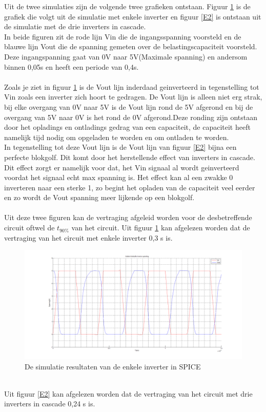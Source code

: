 
Uit de twee simulaties zijn de volgende twee grafieken ontstaan. Figuur \ref{E1} is de grafiek die volgt uit de simulatie met enkele inverter en figuur \ref{E2} is ontstaan uit de simulatie met de drie inverters in cascade.
\\
In beide figuren zit de rode lijn Vin die de ingangsspanning voorsteld en de blauwe lijn Vout die de spanning gemeten over de belastingscapaciteit voorsteld. Deze ingangspanning gaat van 0V naar 5V(Maximale spanning) en andersom binnen 0,05s en heeft een periode van 0,4s.
\\
\\
Zoals je ziet in figuur \ref{E1} is de Vout lijn inderdaad geinverteerd in tegenstelling tot Vin zoals een inverter zich hoort te gedragen. De Vout lijn is alleen niet erg strak, bij elke overgang van 0V naar 5V is de Vout lijn rond de 5V afgerond en bij de overgang van 5V naar 0V is het rond de 0V afgerond.Deze ronding zijn ontstaan door het opladings en ontladings gedrag van een capaciteit, de capaciteit heeft namelijk tijd nodig om opgeladen te worden en om ontladen te worden.  
\\
In tegenstelling tot deze Vout lijn is de Vout lijn van figuur \ref{E2} bijna een perfecte blokgolf. Dit komt door het herstellende effect van inverters in cascade. Dit effect zorgt er namelijk voor dat, het Vin signaal al wordt geinverteerd voordat het signaal echt max spanning is. Het effect kan al een zwakke 0 inverteren naar een sterke 1, zo begint het opladen van de capaciteit veel eerder en zo wordt de Vout spanning meer lijkende op een blokgolf.  
\\ 
\\
Uit deze twee figuren kan de vertraging afgeleid worden voor de desbetreffende circuit oftwel de $t_{90\%}$ van het circuit. Uit figuur \ref{E1} kan afgelezen worden dat de vertraging van het circuit met enkele inverter 0,3 s is. 
\begin{figure} [h!]
\centering
\includegraphics [width = \textwidth] {inputfiles/GrafiekInverter}
\caption{De simulatie resultaten van de enkele inverter in SPICE}
\label{E1}
\end{figure}
\\
Uit figuur \ref{E2} kan afgelezen worden dat de vertraging van het circuit met drie inverters in cascade 0,24 s is.

